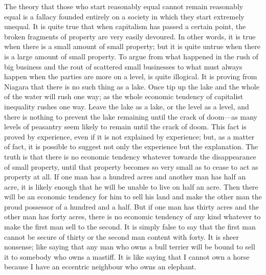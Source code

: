 \documentclass{book}
\begin{document}
The theory that those who start reasonably equal cannot remain reasonably equal is a fallacy founded entirely on a society in which they start extremely unequal. It is quite true that when capitalism has passed a certain point, the broken fragments of property are very easily devoured. In other words, it is true when there is a small amount of small property; but it is quite untrue when there is a large amount of small property. To argue from what happened in the rush of big business and the rout of scattered small businesses to what must always happen when the parties are more on a level, is quite illogical. It is proving from Niagara that there is no such thing as a lake. Once tip up the lake and the whole of the water will rush one way; as the whole economic tendency of capitalist inequality rushes one way. Leave the lake as a lake, or the level as a level, and there is nothing to prevent the lake remaining until the crack of doom—as many levels of peasantry seem likely to remain until the crack of doom. This fact is proved by experience, even if it is not explained by experience; but, as a matter of fact, it is possible to suggest not only the experience but the explanation. The truth is that there is no economic tendency whatever towards the disappearance of small property, until that property becomes so very small as to cease to act as property at all. If one man has a hundred acres and another man has half an acre, it is likely enough that he will be unable to live on half an acre. Then there will be an economic tendency for him to sell his land and make the other man the proud possessor of a hundred and a half. But if one man has thirty acres and the other man has forty acres, there is no economic tendency of any kind whatever to make the first man sell to the second. It is simply false to say that the first man cannot be secure of thirty or the second man content with forty. It is sheer nonsense; like saying that any man who owns a bull terrier will be bound to sell it to somebody who owns a mastiff. It is like saying that I cannot own a horse because I have an eccentric neighbour who owns an elephant.
\end{document}
